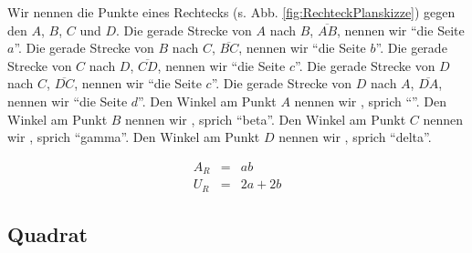 \documentclass[a4paper]{book}%
\theoremstyle{definition}
\begin{document}
Wir nennen die Punkte eines Rechtecks (s. Abb. \ref{fig:RechteckPlanskizze}) gegen den  $A$, $B$, $C$ und $D$. Die gerade Strecke von $A$ nach $B$, $\overline{AB}$, nennen wir \enquote{die Seite $a$}. Die gerade Strecke von $B$ nach $C$, $\overline{BC}$, nennen wir \enquote{die Seite $b$}. Die gerade Strecke von $C$ nach $D$, $\overline{CD}$, nennen wir \enquote{die Seite $c$}. Die gerade Strecke von $D$ nach $C$, $\overline{DC}$, nennen wir \enquote{die Seite $c$}. Die gerade Strecke von $D$ nach $A$, $\overline{DA}$, nennen wir \enquote{die Seite $d$}. Den Winkel am Punkt $A$ nennen wir , sprich \enquote{}. Den Winkel am Punkt $B$ nennen wir , sprich \enquote{beta}. Den Winkel am Punkt $C$ nennen wir , sprich \enquote{gamma}. Den Winkel am Punkt $D$ nennen wir , sprich \enquote{delta}.

\begin{eqnarray}\label{eqn:RechteckFormeln}
    A_R &=& a b\\
    U_R &=& 2a + 2b
\end{eqnarray}


\subsection{Quadrat}
\end{document}
